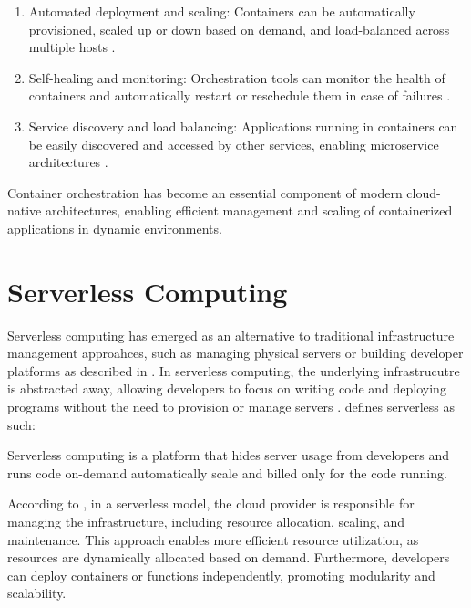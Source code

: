 \documentclass[
  table]{report}
\providecommand{\tightlist}{%
  \setlength{\itemsep}{0pt}\setlength{\parskip}{0pt}}
\begin{document}
\begin{enumerate}
\def\labelenumi{\arabic{enumi}.}
\tightlist
\item
  Automated deployment and scaling: Containers can be automatically
  provisioned, scaled up or down based on demand, and load-balanced
  across multiple hosts \citep{burnsBorgOmegaKubernetes2016}.
\item
  Self-healing and monitoring: Orchestration tools can monitor the
  health of containers and automatically restart or reschedule them in
  case of failures \citep{kubernetesKubernetes}.
\item
  Service discovery and load balancing: Applications running in
  containers can be easily discovered and accessed by other services,
  enabling microservice architectures \citep{kubernetesKubernetes}.
\end{enumerate}

Container orchestration has become an essential component of modern
cloud-native architectures, enabling efficient management and scaling of
containerized applications in dynamic environments.

\section{Serverless Computing}

Serverless computing has emerged as an alternative to traditional
infrastructure management approahces, such as managing physical servers
or building developer platforms as described in 
\citep{baldiniServerlessComputingCurrent2017}. In serverless computing,
the underlying infrastrucutre is abstracted away, allowing developers to
focus on writing code and deploying programs without the need to
provision or manage servers
\citep{baldiniServerlessComputingCurrent2017,robertsServerlessArchitectures2018}.
\citet{castroRiseServerlessComputing2019} defines serverless as such:

\begin{tcolorbox}[
  definitionstyle,
  title=Serverless definition,
]
Serverless computing is a platform that hides server usage from
developers and runs code on-demand automatically scale and billed only for the
code running. \\

\hfill \citep{castroRiseServerlessComputing2019}

\end{tcolorbox}

According to \citet{baldiniServerlessComputingCurrent2017}, in a
serverless model, the cloud provider is responsible for managing the
infrastructure, including resource allocation, scaling, and maintenance.
This approach enables more efficient resource utilization, as resources
are dynamically allocated based on demand. Furthermore, developers can
deploy containers or functions independently, promoting modularity and
scalability.
\end{document}
